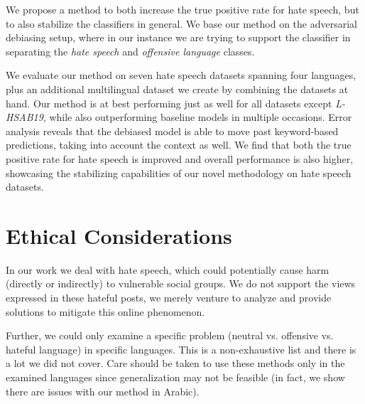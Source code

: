 \documentclass[11pt]{article}
\begin{document}
	We propose a method to both increase the true positive rate for hate speech, but to also stabilize the classifiers in general. We base our method on the adversarial debiasing setup, where in our instance we are trying to support the classifier in separating the \textit{hate speech} and \textit{offensive language} classes.
	
	We evaluate our method on seven hate speech datasets spanning four languages, plus an additional multilingual dataset we create by combining the datasets at hand. Our method is at best performing just as well for all datasets except \textit{L-HSAB19}, while also outperforming baseline models in multiple occasions. Error analysis reveals that the debiased model is able to move past keyword-based predictions, taking into account the context as well. We find that both the true positive rate for hate speech is improved and overall performance is also higher, showcasing the stabilizing capabilities of our novel methodology on hate speech datasets.
	
	\section{Ethical Considerations}
	
	In our work we deal with hate speech, which could potentially cause harm (directly or indirectly) to vulnerable social groups. We do not support the views expressed in these hateful posts, we merely venture to analyze and provide solutions to mitigate this online phenomenon.
	
	Further, we could only examine a specific problem (neutral vs. offensive vs. hateful language) in specific languages. This is a non-exhaustive list and there is a lot we did not cover. Care should be taken to use these methods only in the examined languages since generalization may not be feasible (in fact, we show there are issues with our method in Arabic).
	
	
	
	
	
	
	
	
	
	\appendix
	
	
	
\end{document}
